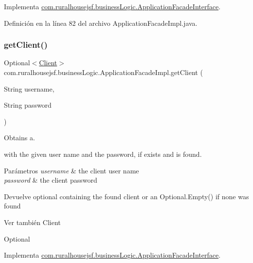 Implementa \mbox{\hyperlink{a00136_aba85657d1479d51b7bf1bd17d66d0513}{com.\+ruralhousejsf.\+business\+Logic.\+Application\+Facade\+Interface}}.



Definición en la línea 82 del archivo Application\+Facade\+Impl.\+java.

\mbox{\label{a00132_a249a902aa3507a04fb15ab5fcf1f082c}} 
\subsubsection{\texorpdfstring{getClient()}{getClient()}}
{\footnotesize\ttfamily Optional$<$\mbox{\hyperlink{a00164}{Client}}$>$ com.\+ruralhousejsf.\+business\+Logic.\+Application\+Facade\+Impl.\+get\+Client (\begin{DoxyParamCaption}\item[{String}]{username,  }\item[{String}]{password }\end{DoxyParamCaption})}



Obtains a. 


\begin{DoxyCode}{0}
\end{DoxyCode}
 with the given user name and the password, if exists and is found.


\begin{DoxyParams}{Parámetros}
{\em username} & the client user name \\
\hline
{\em password} & the client password\\
\hline
\end{DoxyParams}
\begin{DoxyReturn}{Devuelve}
optional containing the found client or an {\ttfamily Optional.\+Empty()} if none was found
\end{DoxyReturn}
\begin{DoxySeeAlso}{Ver también}
Client 

Optional 
\end{DoxySeeAlso}


Implementa \mbox{\hyperlink{a00136_af9901ddc9cbe77aaa08085c3c19167c6}{com.\+ruralhousejsf.\+business\+Logic.\+Application\+Facade\+Interface}}.




